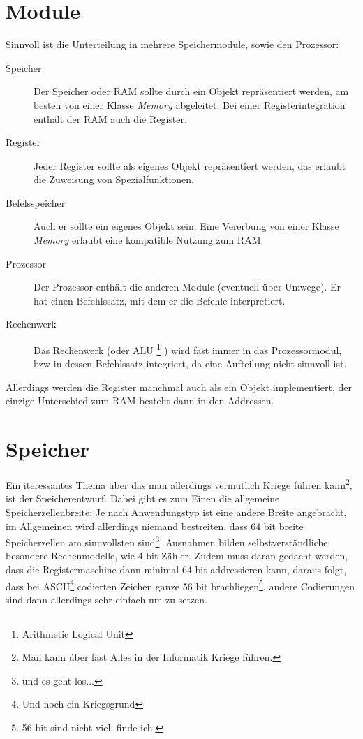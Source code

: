 \documentclass[a4paper,12pt,oneside]{scrreprt}
\begin{document}
\section{Module}

Sinnvoll ist die Unterteilung in mehrere Speichermodule, sowie den Prozessor:

\begin{description}
\item[Speicher] Der Speicher oder RAM sollte durch ein Objekt repräsentiert werden, am besten von einer Klasse \textit{Memory} abgeleitet. Bei einer Registerintegration enthält der RAM auch die Register.

\item[Register] Jeder Register sollte als eigenes Objekt repräsentiert werden, das erlaubt die Zuweisung von Spezialfunktionen.

\item[Befelsspeicher] Auch er sollte ein eigenes Objekt sein. Eine Vererbung von einer Klasse \textit{Memory} erlaubt eine kompatible Nutzung zum RAM.

\item[Prozessor] Der Prozessor enthält die anderen Module (eventuell über Umwege). Er hat einen Befehlssatz, mit dem er die Befehle interpretiert.

\item[Rechenwerk] Das Rechenwerk (oder ALU \footnote{Arithmetic Logical Unit} ) wird fast immer  in das Prozessormodul, bzw in dessen Befehlssatz integriert, da eine Aufteilung nicht sinnvoll ist.

\end{description}

Allerdings werden die Register manchmal auch als ein Objekt implementiert, der einzige Unterschied zum RAM besteht dann in den Addressen.

\section{Speicher}

Ein iteressantes Thema über das man allerdings vermutlich Kriege führen kann\footnote{ Man kann über fast Alles in der Informatik Kriege führen.}, ist der Speicherentwurf. Dabei gibt es zum Einen die allgemeine Speicherzellenbreite: Je nach Anwendungstyp ist eine andere Breite angebracht, im Allgemeinen wird allerdings niemand bestreiten, dass 64 bit breite Speicherzellen am sinnvollsten sind\footnote{und es geht los...}. 
Ausnahmen bilden selbstverständliche besondere Rechenmodelle, wie 4 bit Zähler. Zudem muss daran gedacht werden, dass die Registermaschine dann minimal 64 bit addressieren kann, daraus folgt, dass bei ASCII\footnote{Und noch ein Kriegsgrund} codierten Zeichen ganze 56 bit brachliegen\footnote{56 bit sind nicht viel, finde ich.}, andere Codierungen sind dann allerdings sehr einfach um zu setzen.
\end{document}
